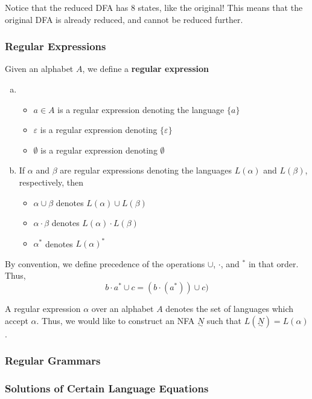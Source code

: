 Notice that the reduced DFA has 8 states, like the original! This means that the original DFA is already reduced, and cannot be reduced further.

\subsubsection{Regular Expressions}
\begin{definition}
Given an alphabet $A$, we define a \textbf{regular expression}
\begin{enumerate}[(a)]
    \item \begin{itemize}
        \item $a\in A$ is a regular expression denoting the language $\{a\}$
        \item $\varepsilon$ is a regular expression denoting $\{\varepsilon\}$
        \item $\emptyset$ is a regular expression denoting $\emptyset$
    \end{itemize}
    
    \item If $\alpha$ and $\beta$ are regular expressions denoting the languages $L(\alpha)$ and $L(\beta)$, respectively, then 
    \begin{itemize}
        \item $\alpha\cup\beta$ denotes $L(\alpha)\cup L(\beta)$
        \item $\alpha\cdot\beta$ denotes $L(\alpha)\cdot L(\beta)$
        \item $\alpha^*$ denotes $L(\alpha)^*$
    \end{itemize}
\end{enumerate}
\end{definition}

By convention, we define precedence of the operations $\cup$, $\cdot$, and $^*$ in that order. Thus, \[b\cdot a^*\cup c=(b\cdot(a^*))\cup c)\]

A regular expression $\alpha$ over an alphabet $A$ denotes the set of languages which accept $\alpha$. Thus, we would like to construct an NFA $\underset{\sim}{N}$ such that $L(\underset{\sim}{N})=L(\alpha)$.

\subsubsection{Regular Grammars}
\subsubsection{Solutions of Certain Language Equations}